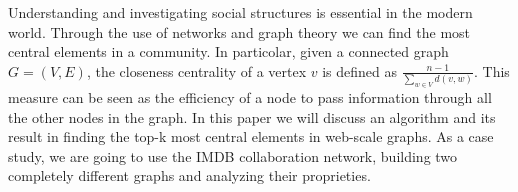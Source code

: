 Understanding and investigating social structures is essential in the modern world. Through the use of networks and graph theory we can find the most central elements in a community. In particolar, given a connected graph $G=(V,E)$, the closeness centrality of a vertex $v$ is defined as $ \frac{n-1}{\sum_{w \in V} d(v,w)}$. This measure can be seen as the efficiency of a node to pass information through all the other nodes in the graph. In this paper we will discuss an algorithm and its result in finding the top-k most central elements in web-scale graphs. As a case study, we are going to use the IMDB collaboration network, building two completely different graphs and analyzing their proprieties.


